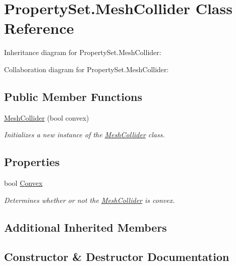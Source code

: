\hypertarget{class_property_set_1_1_mesh_collider}{}\section{Property\+Set.\+Mesh\+Collider Class Reference}
\label{class_property_set_1_1_mesh_collider}


Inheritance diagram for Property\+Set.\+Mesh\+Collider\+:


Collaboration diagram for Property\+Set.\+Mesh\+Collider\+:
\subsection*{Public Member Functions}
\begin{DoxyCompactItemize}
\item 
\hyperlink{class_property_set_1_1_mesh_collider_a700e1c984f46aab9ef8eb989a2aa7545}{Mesh\+Collider} (bool convex)
\begin{DoxyCompactList}\small\item\em Initializes a new instance of the \hyperlink{class_property_set_1_1_mesh_collider}{Mesh\+Collider} class. \end{DoxyCompactList}\end{DoxyCompactItemize}
\subsection*{Properties}
\begin{DoxyCompactItemize}
\item 
bool \hyperlink{class_property_set_1_1_mesh_collider_a4888f42e196344977eae58654dddf265}{Convex}
\begin{DoxyCompactList}\small\item\em Determines whether or not the \hyperlink{class_property_set_1_1_mesh_collider}{Mesh\+Collider} is convex. \end{DoxyCompactList}\end{DoxyCompactItemize}
\subsection*{Additional Inherited Members}


\subsection{Constructor \& Destructor Documentation}
\mbox{\label{class_property_set_1_1_mesh_collider_a700e1c984f46aab9ef8eb989a2aa7545}} 

